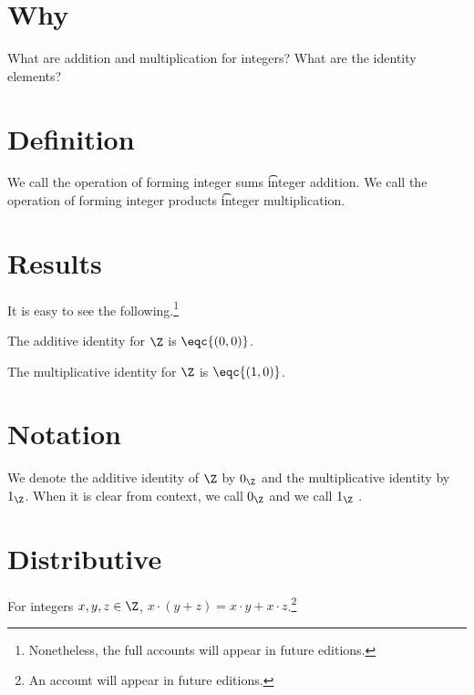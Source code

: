 

\section*{Why}

What are addition and multiplication for integers?
What are the identity elements?

\section*{Definition}

We call the operation of forming integer sums \t{integer addition}.
We call the operation of forming integer products \t{integer multiplication}.

\section*{Results}

It is easy to see the following.\footnote{Nonetheless, the full accounts will appear in future editions.}

\begin{proposition}
The additive identity for $\Z $ is $\eqc{(0, 0)}$.\end{proposition}
\begin{proposition}
The multiplicative identity for $\Z $ is $\eqc{(1, 0)}$.\end{proposition}
\section*{Notation}

We denote the additive identity of $\Z $ by $0_{\Z }$ and the multiplicative identity by $1_{\Z }$.
When it is clear from context, we call $0_{\Z }$  and we call $1_{\Z }$ .

\section*{Distributive}

\begin{proposition}
For integers $x, y, z \in \Z $, $x \cdot  (y + z) = x \cdot  y + x \cdot  z$.\footnote{An account will appear in future editions.}\end{proposition}
\blankpage